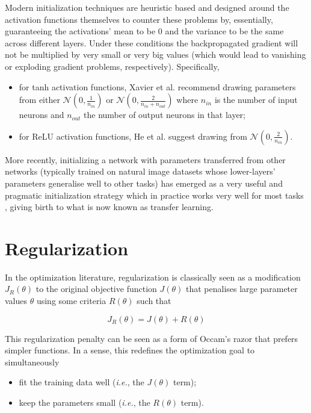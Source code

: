 Modern initialization techniques are heuristic based and designed around the activation functions themselves to counter these problems by, essentially, guaranteeing the activations' mean to be $0$ and the variance to be the same across different layers. Under these conditions the backpropagated gradient will not be multiplied by very small or very big values (which would lead to vanishing or exploding gradient problems, respectively). Specifically,

\begin{itemize}
    \item for tanh activation functions, Xavier et al. \cite{xavierinit} recommend drawing parameters from either $\mathcal{N}(0, \frac{1}{n_{in}})$ or $\mathcal{N}(0, \frac{2}{n_{in}+n_{out}})$ where $n_{in}$ is the number of input neurons and $n_{out}$ the number of output neurons in that layer;
    \item for ReLU activation functions, He et al. \cite{heinit} suggest drawing from $\mathcal{N}(0, \frac{2}{n_{in}})$.
\end{itemize}

More recently, initializing a network with parameters transferred from other networks (typically trained on natural image datasets whose lower-layers' parameters generalise well to other tasks) has emerged as a very useful and pragmatic initialization strategy which in practice works very well for most tasks \cite{howtransferable}, giving birth to what is now known as transfer learning.

\section{Regularization}

In the optimization literature, regularization is classically seen as a modification $J_R(\theta)$ to the original objective function $J(\theta)$ that penalises large parameter values $\theta$ using some criteria $R(\theta)$ such that

\begin{equation}
J_R(\theta) = J(\theta) + R(\theta)
\end{equation}

This regularization penalty can be seen as a form of Occam's razor that prefers simpler functions. In a sense, this redefines the optimization goal to simultaneously

\begin{itemize}
    \item fit the training data well (\textit{i.e.}, the $J(\theta)$ term);
    \item keep the parameters small (\textit{i.e.}, the $R(\theta)$ term).
\end{itemize}

